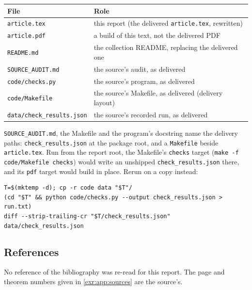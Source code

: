 \documentclass[11pt,letterpaper]{article}
\numberwithin{equation}{section}
\theoremstyle{definition}
\theoremstyle{remark}
\newcommand{\rpath}[1]{\nolinkurl{#1}}%
\begin{document}
\begin{center}\small
\begin{tabular}{@{}ll@{}}
\toprule
File & Role \\
\midrule
\rpath{article.tex} & this report (the delivered \texttt{article.tex}, rewritten)\\
\rpath{article.pdf} & a build of this text, not the delivered PDF\\
\rpath{README.md} & the collection README, replacing the delivered one\\
\rpath{SOURCE_AUDIT.md} & the source's audit, as delivered\\
\rpath{code/checks.py} & the source's program, as delivered\\
\rpath{code/Makefile} & the source's Makefile, as delivered (delivery layout)\\
\rpath{data/check_results.json} & the source's recorded run, as delivered\\
\bottomrule
\end{tabular}
\end{center}

\rpath{SOURCE_AUDIT.md}, the Makefile and the program's docstring name the
delivery paths: \texttt{check\_results.json} at the package root, and a
\texttt{Makefile} beside \texttt{article.tex}. Run from the report root, the
Makefile's \texttt{checks} target (\texttt{make -f code/Makefile checks})
would write an unshipped \rpath{check_results.json} there, and its
\texttt{pdf} target would build in place. Rerun on a copy instead:
\begin{verbatim}
T=$(mktemp -d); cp -r code data "$T"/
(cd "$T" && python code/checks.py --output check_results.json > run.txt)
diff --strip-trailing-cr "$T/check_results.json" data/check_results.json
\end{verbatim}

\subsection{References}\label{exr:app:references}

No reference of the bibliography was re-read for this report. The page and
theorem numbers given in \cref{exr:app:sources} are the source's.
\end{document}
